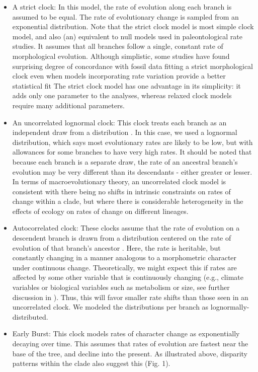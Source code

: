 \documentclass{article}
\begin{document}
\begin{itemize}
    \item A strict clock: In this model, the rate of evolution along each branch is assumed to be equal. The rate of evolutionary change is sampled from an exponential distribution. 
    Note that the strict clock model is most simple clock model, and also (an) equivalent to null models used in paleontological rate studies. 
    It assumes that all branches follow a single, constant rate of morphological evolution. 
    Although simplistic, some studies have found surprising degree of concordance with fossil data fitting a strict morphological clock even when models incorporating rate variation provide a better statistical fit \citep{Drummond2016, Wright2017jp}
    The strict clock model has one advantage in its simplicity: it adds only one parameter to the analyses, whereas relaxed clock models require many additional parameters.
    \item An uncorrelated lognormal clock: This clock treats each branch as an independent draw from a distribution \citep{Drummond2006, Drummond2007}.  
    In this case, we used a lognormal distribution, which says most evolutionary rates are likely to be low, but with allowances for some branches to have very high rates. 
    It should be noted that because each branch is a separate draw, the rate of an ancestral branch's evolution may be very different than its descendants - either greater or lesser.  In terms of macroevolutionary theory, an uncorrelated clock model is consistent with there being no shifts in intrinsic constraints on rates of change within a clade, but where there is considerable heterogeneity in the effects of ecology on rates of change on different lineages.  
    \item Autocorrelated clock: These clocks assume that the rate of evolution on a descendent branch is drawn from a distribution centered on the rate of evolution of that branch's ancestor \citep{Aris-Brosou2002}.  Here, the rate is heritable, but constantly changing in a manner analogous to a morphometric character under continuous change.  Theoretically, we might expect this if rates are affected by some other variable that is continuously changing (e.g., climate variables or biological variables such as metabolism or size, see further discussion in \cite{bromham1996, gaut1992,thomas2006,bromham2015}).  %
    Thus, this will favor smaller rate shifts than those seen in an uncorrelated clock. 
    We modeled the distributions per branch as lognormally-distributed.
    \item Early Burst: This clock models rates of character change as exponentially decaying over time. 
    This assumes that rates of evolution are fastest near the base of the tree, and decline into the present. 
    As illustrated above, disparity patterns within the clade also suggest this (Fig. 1).
\end{itemize}
\end{document}

